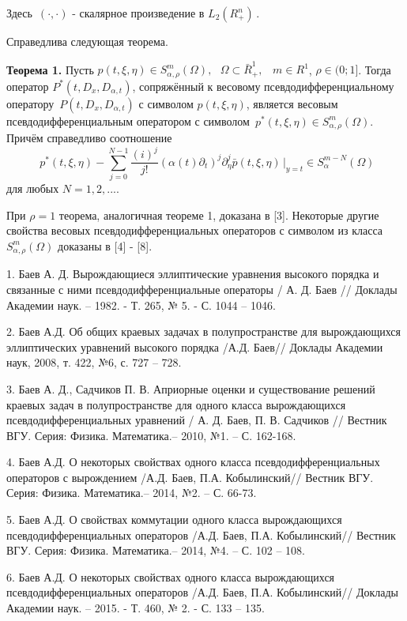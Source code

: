 {Здесь $\,( \cdot , \cdot )$ - скалярное произведение в $L_2 (R_ + ^n )\,$.

Справедлива следующая теорема.

\textbf{Теорема 1.} Пусть $p(t,\xi ,\eta ) \in S_{\alpha ,\rho }^m (\Omega
),\,\,\,\,\Omega \subset \bar {R}_ + ^1 ,\,\,\,\,\,m \in R^1$, $\rho \in
(0;1]$. Тогда оператор $P^\ast (t,D_x ,D_{\alpha ,t} )$, сопряжённый к
весовому псевдодифференциальному оператору $\,P(t,D_x ,D_{\alpha ,t} )$ с
символом $p(t,\xi ,\eta )$, является весовым псевдодифференциальным
оператором с символом $\,p^\ast (t,\xi ,\eta ) \in S_{\alpha ,\rho }^m
(\Omega )$. Причём справедливо соотношение
\[
\,\,p^\ast (t,\xi ,\eta ) - \sum\limits_{j = 0}^{N - 1} {\frac{(i)^j}{j!}}
(\alpha (t)\partial _t )^j\partial _\eta ^j \left. {\bar {p}(t,\xi ,\eta
)\,} \right|_{y = t} \in S_\alpha ^{m - N} (\Omega )
\]
для любых $N = 1,2,...$.



При $\rho = 1$ теорема, аналогичная теореме 1, доказана в [3]. Некоторые
другие свойства весовых псевдодифференциальных операторов с символом из
класса $S_{\alpha ,\rho }^m (\Omega )$ доказаны в [4] - [8].

\litlist

1. Баев А. Д. Вырождающиеся эллиптические уравнения высокого порядка и
связанные с ними псевдодифференциальные операторы / А. Д. Баев // Доклады
Академии наук. -- 1982. - Т. 265, № 5. - С. 1044 -- 1046.

2. Баев А.Д. Об общих краевых задачах в полупространстве для вырождающихся
эллиптических уравнений высокого порядка /А.Д. Баев// Доклады Академии наук,
2008, т. 422, №6, с. 727 -- 728.

3. Баев А. Д., Садчиков П. В. Априорные оценки и существование решений
краевых задач в полупространстве для одного класса вырождающихся
псевдодифференциальных уравнений / А. Д. Баев, П. В. Садчиков // Вестник
ВГУ. Серия: Физика. Математика.-- 2010, №1. -- С. 162-168.

4. Баев А.Д. О некоторых свойствах одного класса псевдодифференциальных
операторов с вырождением /А.Д. Баев, П.А. Кобылинский// Вестник ВГУ. Серия:
Физика. Математика.-- 2014, №2. -- С. 66-73.

5. Баев А.Д. О свойствах коммутации одного класса вырождающихся
псевдодифференциальных операторов /А.Д. Баев, П.А. Кобылинский// Вестник
ВГУ. Серия: Физика. Математика.-- 2014, №4. -- С. 102 -- 108.

6. Баев А.Д. О некоторых свойствах одного класса вырождающихся
псевдодифференциальных операторов /А.Д. Баев, П.А. Кобылинский// Доклады
Академии наук. -- 2015. - Т. 460, № 2. - С. 133 -- 135.

}
